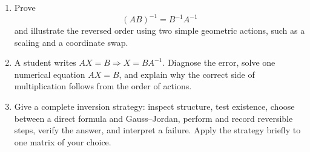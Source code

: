 \begin{enumerate}
\item Prove
\[
(AB)^{-1}=B^{-1}A^{-1}
\]
and illustrate the reversed order using two simple geometric actions, such as a scaling and a coordinate swap.

\item A student writes $AX=B\Rightarrow X=BA^{-1}$. Diagnose the error, solve one numerical equation $AX=B$, and explain why the correct side of multiplication follows from the order of actions.

\item Give a complete inversion strategy: inspect structure, test existence, choose between a direct formula and Gauss--Jordan, perform and record reversible steps, verify the answer, and interpret a failure. Apply the strategy briefly to one matrix of your choice.
\end{enumerate}
